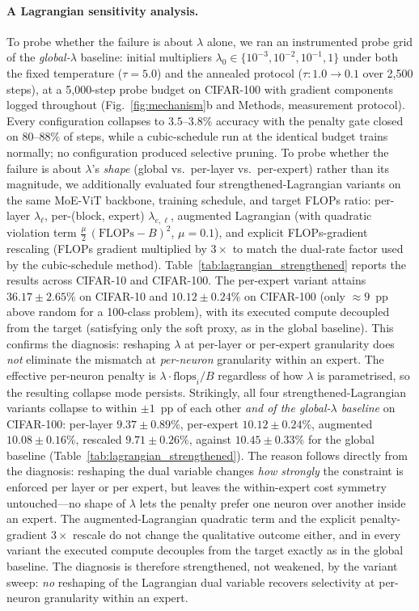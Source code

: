 \documentclass[fleqn,10pt]{article}
\begin{document}
\paragraph{A Lagrangian sensitivity analysis.}
To probe whether the failure is about $\lambda$ alone, we ran an
instrumented probe grid of the \emph{global-$\lambda$} baseline:
initial multipliers $\lambda_0 \in \{10^{-3},10^{-2},10^{-1},1\}$
under both the fixed temperature ($\tau{=}5.0$) and the annealed
protocol ($\tau\!:1.0\!\to\!0.1$ over 2{,}500 steps), at a
5{,}000-step probe budget on CIFAR-100 with gradient components
logged throughout (Fig.~\ref{fig:mechanism}b and Methods,
measurement protocol). Every configuration collapses to
$3.5$--$3.8\%$ accuracy with the penalty gate closed on
$80$--$88\%$ of steps, while a cubic-schedule run at the identical
budget trains normally; no configuration produced selective
pruning. To
probe whether the failure is about $\lambda$'s
\emph{shape} (global vs.\ per-layer vs.\ per-expert) rather than its
magnitude, we additionally evaluated four strengthened-Lagrangian
variants on the same MoE-ViT backbone, training schedule, and
target FLOPs ratio: per-layer $\lambda_\ell$, per-(block, expert)
$\lambda_{e,\ell}$, augmented Lagrangian (with quadratic violation
term $\tfrac{\mu}{2}\,(\mathrm{FLOPs}-B)^2$, $\mu{=}0.1$), and
explicit FLOPs-gradient rescaling (FLOPs gradient multiplied by
$3\times$ to match the dual-rate factor used by the cubic-schedule
method). Table~\ref{tab:lagrangian_strengthened} reports the
results across CIFAR-10 and CIFAR-100. The per-expert variant
attains $36.17 \pm 2.65\%$ on CIFAR-10 and $10.12 \pm 0.24\%$ on
CIFAR-100 (only $\approx 9$~pp above random for a 100-class
problem), with its executed compute decoupled from the target
(satisfying only the soft proxy, as in the global baseline). This
confirms the diagnosis: reshaping $\lambda$ at per-layer or
per-expert granularity does \emph{not} eliminate the mismatch at
\emph{per-neuron} granularity within an expert. The effective
per-neuron penalty is $\lambda \cdot \mathrm{flops}_i/B$ regardless
of how $\lambda$ is parametrised, so the resulting collapse mode
persists. Strikingly, all four strengthened-Lagrangian variants
collapse to within $\pm 1$~pp of each other \emph{and of the
global-$\lambda$ baseline} on CIFAR-100:
per-layer $9.37 \pm 0.89\%$, per-expert $10.12 \pm 0.24\%$,
augmented $10.08 \pm 0.16\%$, rescaled $9.71 \pm 0.26\%$, against
$10.45 \pm 0.33\%$ for the global baseline
(Table~\ref{tab:lagrangian_strengthened}). The reason follows
directly from the diagnosis: reshaping the dual variable changes
\emph{how strongly} the constraint is enforced per layer or per
expert, but leaves the within-expert cost symmetry untouched---no
shape of $\lambda$ lets the penalty prefer one neuron over another
inside an expert. The augmented-Lagrangian quadratic term and the
explicit penalty-gradient $3\times$ rescale do not change the
qualitative outcome either, and in every variant the executed
compute decouples from the target exactly as in the global
baseline. The diagnosis is therefore strengthened, not weakened, by
the variant sweep: \emph{no} reshaping of the Lagrangian dual
variable recovers selectivity at per-neuron granularity within an
expert.
\end{document}
